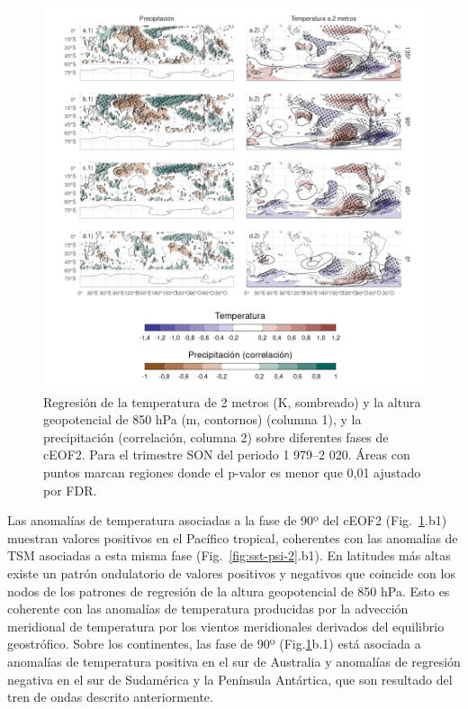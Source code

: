 \documentclass[12pt,oneside,a4paper]{reedthesis}
\begin{document}
\begin{figure}

{\centering \includegraphics{figures/20-ceofs/pp-temp-2-1} 

}

\caption{Regresión de la temperatura de 2 metros (K, sombreado) y la altura geopotencial de 850 hPa (m, contornos) (columna 1), y la precipitación (correlación, columna 2) sobre diferentes fases de cEOF2. Para el trimestre SON del periodo 1 979--2 020. Áreas con puntos marcan regiones donde el p-valor es menor que 0,01 ajustado por FDR.}\label{fig:pp-temp-2}
\end{figure}

Las anomalías de temperatura asociadas a la fase de 90º del cEOF2 (Fig.~\ref{fig:pp-temp-2}.b1) muestran valores positivos en el Pacífico tropical, coherentes con las anomalías de TSM asociadas a esta misma fase (Fig.~\ref{fig:sst-psi-2}.b1).
En latitudes más altas existe un patrón ondulatorio de valores positivos y negativos que coincide con los nodos de los patrones de regresión de la altura geopotencial de 850 hPa.
Esto es coherente con las anomalías de temperatura producidas por la advección meridional de temperatura por los vientos meridionales derivados del equilibrio geostrófico.
Sobre los continentes, las fase de 90º (Fig.\ref{fig:pp-temp-2}b.1) está asociada a anomalías de temperatura positiva en el sur de Australia y anomalías de regresión negativa en el sur de Sudamérica y la Península Antártica, que son resultado del tren de ondas descrito anteriormente.
\end{document}
